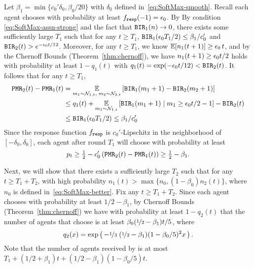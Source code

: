   Let $\beta_1 = \min\{c_0'\delta_0, \beta_0/20\}$ with $\delta_0$
  defined in~\eqref{eq:SoftMax-smooth}.  Recall each agent chooses
  \alg[1] with probability at least $f_{\mathtt{resp}}(-1)= \epsilon_0$.  By
By condition \eqref{eq:SoftMax-assn-strong} and the fact that
$\mathtt{BIR}_1(n) \to 0$,
  there exists some sufficiently large $T_1$ such that for any
  $t\geq T_1$, $\mathtt{BIR}_1(\epsilon_0 T_1/2) \leq \beta_1/c_0'$ and
  $\mathtt{BIR}_2(t) > e^{-\epsilon_0 t/12}$. Moreover, for any $t\geq T_1$, we
  know $\E[n_1(t+1)] \geq \eps_0\,t $, and by the Chernoff Bounds
  (Theorem~\ref{thm:chernoff}), we have $n_1(t+1) \geq \epsilon_0 t/2$
  holds with probability at least $1 - q_1(t)$ with
  $q_1(t) = \exp(-\epsilon_0 t/12) < \mathtt{BIR}_2(t)$. It follows that for any $t\geq T_1$,
\begin{align*}
  \mathtt{PMR}_2(t) - \mathtt{PMR}_1(t) &= \operatorname*{\mathbb{E}}_{m_1\sim \mathcal{N}_{1,t},\;m_2\sim \mathcal{N}_{2,t}}\left[\mathtt{BIR}_1(m_1+ 1) - \mathtt{BIR}_2(m_2+1)\right] \\
                        &\leq q_1(t)  + \operatorname*{\mathbb{E}}_{m_1\sim \mathcal{N}_{1,t}}\left[\mathtt{BIR}_1(m_1+ 1)\mid m_1 \geq \epsilon_0 t/2 - 1 \right] - \mathtt{BIR}_2(t)\\
                        &\leq \mathtt{BIR}_1(\epsilon_0 T_1/2) \leq \beta_1/c_0'
\end{align*}
Since the response function $f_{\mathtt{resp}}$ is $c_0'$-Lipschitz in the
neighborhood of $[-\delta_0, \delta_0]$, each agent after round $T_1$
will choose \alg[1] with probability at least
\[
  p_t \geq \tfrac{1}{2} - c_0'\left(\mathtt{PMR}_2(t) - \mathtt{PMR}_1(t)\right) \geq
  \tfrac{1}{2} - \beta_1.
\]

Next, we will show that there exists a sufficiently large $T_2$ such
that for any $t\geq T_1 + T_2$, with high probability
$n_1(t) > \max\{n_0, (1 - \beta_0)n_2(t)\}$, where $n_0$ is defined
in~\eqref{eq:SoftMax-better}. %
Fix any $t \geq T_1 + T_2$.
Since each agent chooses \alg[1] with probability at least
$1/2 - \beta_1$, by Chernoff Bounds (Theorem~\ref{thm:chernoff}) we
have with probability at least $1 - q_2(t)$ that the number of agents
that choose \alg[1] is at least
    $\beta_0(\nicefrac{1}{2} - \beta_1)t/5$,
where %
$$
q_2(x) = \exp\left(\, -\nicefrac{1}{3}\;
    (\nicefrac{1}{2} - \beta_1)(1 - \beta_0/5)^2x\,\right) .
$$
Note that the number of agents received by \alg[2] is at most
$T_1 + (1/2 + \beta_1)t + (1/2 - \beta_1)(1 - \beta_0/5)t$.

